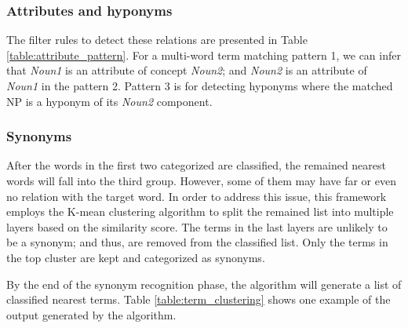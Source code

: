\documentclass[Journal, BackFigs, DoubleSpace]{ascelike}%
\begin{document}
\subsubsection{Attributes and hyponyms}
The filter rules to detect these relations are presented in Table \ref{table:attribute_pattern}. For a multi-word term matching pattern 1, we can infer that \textit{Noun1} is an attribute of concept \textit{Noun2}; and \textit{Noun2} is an attribute of \textit{Noun1} in the pattern 2. Pattern 3 is for detecting hyponyms where the matched NP is a hyponym of its \textit{Noun2} component.  
\subsubsection{Synonyms}
After the words in the first two categorized are classified, the remained nearest words will fall into the third group. However, some of them may have far or even no relation with the target word. In order to address this issue, this framework employs the K-mean clustering algorithm \cite{macqueen67} to split the remained list into multiple layers based on the similarity score. The terms in the last layers are unlikely to be a synonym; and thus, are removed from the classified list. Only the terms in the top cluster are kept and categorized as synonyms. 
\par
By the end of the synonym recognition phase, the algorithm will generate a list of classified nearest terms. Table \ref{table:term_clustering} shows one example of the output generated by the algorithm. 
%
\end{document}
